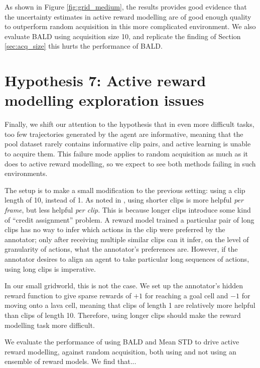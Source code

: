 \documentclass[11pt, a4paper, bibliography=totoc]{report}
\begin{document}
As shown in Figure \ref{fig:grid_medium}, the results provides good evidence that the uncertainty estimates in active reward modelling are of good enough quality to outperform random acquisition in this more complicated environment. We also evaluate BALD using acquisition size 10, and replicate the finding of Section \ref{sec:acq_size} this hurts the performance of BALD.

\section{Hypothesis 7: Active reward modelling exploration issues}
Finally, we shift our attention to the hypothesis that in even more difficult tasks, too few trajectories generated by the agent are informative, meaning that the pool dataset rarely contains informative clip pairs, and active learning is unable to acquire them. This failure mode applies to random acquisition as much as it does to active reward modelling, so we expect to see both methods failing in such environments.

The setup is to make a small modification to the previous setting: using a clip length of 10, instead of 1. As noted in \cite[p.~10]{Christiano2017}, using shorter clips is more helpful \textit{per frame}, but less helpful \textit{per clip}. This is because longer clips introduce some kind of ``credit assignment'' problem. A reward model trained a particular pair of long clips has no way to infer which actions in the clip were preferred by the annotator; only after receiving multiple similar clips can it infer, on the level of granularity of actions, what the annotator's preferences are. However, if the annotator desires to align an agent to take particular long sequences of actions, using long clips is imperative.

In our small gridworld, this is not the case. We set up the annotator's hidden reward function to give sparse rewards of $ +1 $ for reaching a goal cell and $-1$ for moving onto a lava cell, meaning that clips of length 1 are relatively more helpful than clips of length 10. Therefore, using longer clips should make the reward modelling task more difficult.

We evaluate the performance of using BALD and Mean STD to drive active reward modelling, against random acquisition, both using and not using an ensemble of reward models. We find that...
\end{document}
